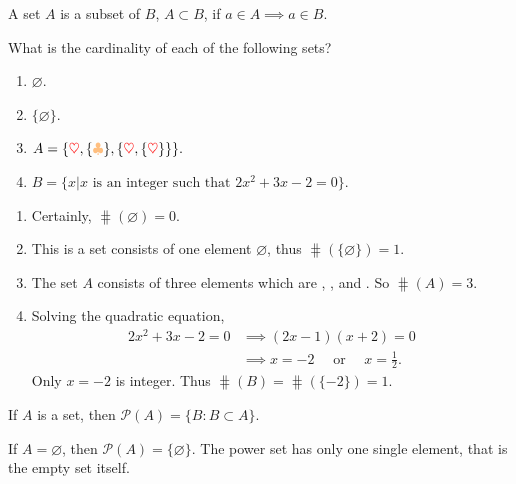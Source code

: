 \begin{definition}[Subsets]
    A set $A$ is a subset of $B$, $A \subset B$, if $a \in A \implies a \in B$.
\end{definition}

\begin{example}
    What is the cardinality of each of the following sets?
    \begin{enumerate}
        \item $\varnothing$.
        \item $\{ \varnothing \}$.
        \item $A = \{ {\color{red}\heartsuit},  \{{\color{orange!50!white} \clubsuit } \} , \{{\color{red}\heartsuit}, \{{\color{red}\heartsuit}\} \} \}.$
        \item $B = \{ x | x \text{ is an integer such that } 2x^2 + 3x - 2 = 0 \}.$
    \end{enumerate}
\end{example}
\begin{solution}
    \begin{enumerate}
        \item Certainly, $\hash(\varnothing) = 0$.
        \item This is a set consists of one element $\varnothing$, thus $\hash(\{ \varnothing \}) = 1$.
        \item The set $A$ consists of three elements which are \fbox{${\color{red}\heartsuit}$}, \fbox{$\{{\color{orange!50!white} \clubsuit } \}$}, 
        and \fbox{$\{{\color{red}\heartsuit}, \{{\color{red}\heartsuit}\} \}$}. So $\hash(A) = 3$.
        \item Solving the quadratic equation,
            \begin{align*}
                2x^2 + 3x - 2 = 0 &\implies (2x - 1)(x + 2) = 0\\
                &\implies x = -2 \quad \text{ or } \quad x = \frac{1}{2}.
            \end{align*}
        Only $x = -2$ is integer. Thus $\hash (B) = \hash (\{-2\}) = 1$.
    \end{enumerate}
\end{solution}

\begin{definition}
    If $A$ is a set, then $\mathcal{P}(A) = \{B : B \subset A\}$.
\end{definition}

\begin{example}
    If $A = \varnothing$, then $\mathcal{P}(A) = \{ \varnothing \}$. The power set has only one single element, that is the 
    empty set itself.
\end{example}

